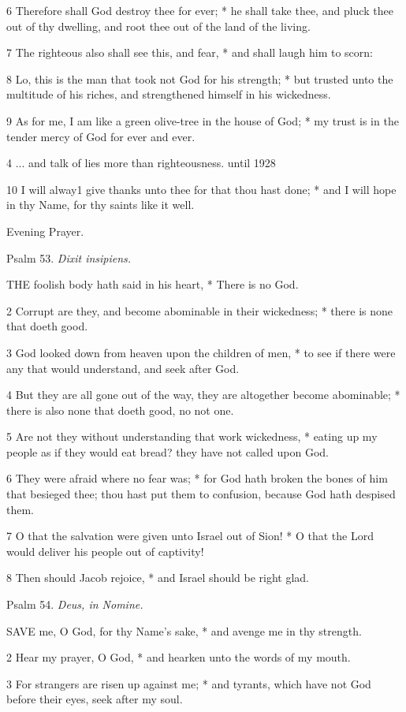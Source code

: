 6 Therefore shall God destroy thee for ever; * he shall
take thee, and pluck thee out of thy dwelling, and root thee out of the
land of the living.

7 The righteous also shall see this, and fear, * and
shall laugh him to scorn:

8 Lo, this is the man that took not God for his strength;
* but trusted unto the multitude of his riches, and strengthened himself
in his wickedness.

9 As for me, I am like a green olive-tree in the house
of God; * my trust is in the tender mercy of God for ever and ever.

4 ... and talk
of lies more than righteousness.
until 1928

10 I will alway1 give thanks unto thee for that thou hast done;
* and I will hope in thy Name, for thy saints like it well.

Evening Prayer.

Psalm
53. \emph{Dixit insipiens.}

THE
foolish body hath said in his heart, * There is no God.

2 Corrupt are they, and become abominable in their
wickedness; * there is none that doeth good.

3 God looked down from heaven upon the children of
men, * to see if there were any that would understand, and seek after
God.

4 But they are all gone out of the way, they are altogether
become abominable; * there is also none that doeth good, no not one.

5 Are not they without understanding that work wickedness,
* eating up my people as if they would eat bread? they have not called
upon God.

6 They were afraid where no fear was; * for God hath
broken the bones of him that besieged thee; thou hast put them to confusion,
because God hath despised them.

7 O that the salvation were given unto Israel out of
Sion! * O that the Lord would deliver his people out of captivity!

8 Then should Jacob rejoice, * and Israel should be
right glad.

Psalm
54. \emph{Deus, in Nomine.}

SAVE
me, O God, for thy Name's sake, * and avenge me in thy strength.

2 Hear my prayer, O God, * and hearken unto the words
of my mouth.

3 For strangers are risen up against me; * and tyrants,
which have not God before their eyes, seek after my soul.

